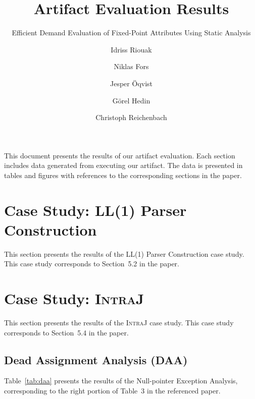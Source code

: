 \documentclass[acmsmall, screen, review, nonacm]{acmart}
\begin{document}
\title{Artifact Evaluation Results}
\subtitle{Efficient Demand Evaluation of Fixed-Point Attributes Using Static Analysis}


\author{Idriss Riouak}
\author{Niklas Fors}

\author{Jesper {\"O}qvist}
\author{G{\"o}rel Hedin}
\author{Christoph Reichenbach}



\renewcommand{\shortauthors}{Riouak et al.}


\maketitle

This document presents the results of our artifact evaluation. Each section
includes data generated from executing our artifact. The data is presented in
tables and figures with references to the corresponding sections in the paper.

\section{Case Study: LL(1) Parser Construction}
This section presents the results of the LL(1) Parser Construction case study.
This case study corresponds to Section~5.2 in the paper.





\section{Case Study: \textsc{IntraJ}}
This section presents the results of the \textsc{IntraJ} case study.
This case study corresponds to Section~5.4 in the paper.


\subsection{Dead Assignment Analysis (DAA)}
Table~\ref{tab:daa} presents the results of the Null-pointer Exception Analysis, corresponding to the right portion of Table~3 in the referenced paper.
\end{document}
